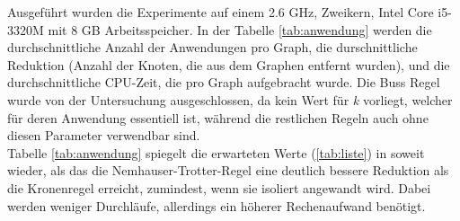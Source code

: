  Ausgeführt wurden die Experimente auf einem 2.6 GHz, Zweikern, Intel Core i5-3320M mit 8 GB Arbeitsspeicher. In der Tabelle \ref{tab:anwendung} werden die durchschnittliche Anzahl der Anwendungen pro Graph, die durschnittliche Reduktion (Anzahl der Knoten, die aus dem Graphen entfernt wurden), und die durchschnittliche CPU-Zeit, die pro Graph aufgebracht wurde. Die Buss Regel wurde von der Untersuchung ausgeschlossen, da kein Wert für \emph{k} vorliegt, welcher für deren Anwendung essentiell ist, während die restlichen Regeln auch ohne diesen Parameter verwendbar sind.\\
Tabelle \ref{tab:anwendung} spiegelt die erwarteten Werte (\ref{tab:liste}) in soweit wieder, als das die Nemhauser-Trotter-Regel eine deutlich bessere Reduktion als die Kronenregel erreicht, zumindest, wenn sie isoliert angewandt wird. Dabei werden weniger Durchläufe, allerdings ein höherer Rechenaufwand benötigt.

